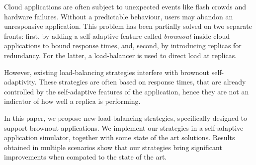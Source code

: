 Cloud applications are often subject to unexpected events like flash crowds
and hardware failures. Without a predictable behaviour, users may abandon
an unresponsive application.
This problem has been partially solved on two separate fronts:
first, by adding a self-adaptive feature called \emph{brownout} inside cloud applications to bound response times, and, second,
by introducing replicas for redundancy. For the latter, a load-balancer is used to direct load at replicas.

However, existing load-balancing strategies interfere with brownout self-adaptivity.
These strategies are often based on response times, that
are already controlled by the self-adaptive features of the application, hence they are
not an indicator of how well a replica is performing.

In this paper, we propose new load-balancing strategies, specifically
designed to support brownout applications. We implement our strategies in a self-adaptive
application simulator, together with some state of the art
solutions. Results obtained in multiple
scenarios show that our strategies bring significant improvements when
compated to the state of the art.

